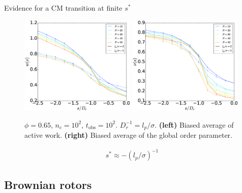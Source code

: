 \documentclass{beamer}
\begin{document}
\begin{frame}{Evidence for a CM transition at finite $s^*$}

\begin{figure}
\centering
\includegraphics[width=0.49\textwidth]{sWorkN.eps}
\hfill
\includegraphics[width=0.49\textwidth]{sOrderN.eps}
\caption{$\phi = 0.65$, $n_c = 10^2$, $t_{\text{obs}} = 10^2$. $D_r^{-1} = l_p/\sigma$. {\bf (left)} Biased average of active work. {\bf (right)} Biased average of the global order parameter.}
\end{figure}
\begin{align*}
  s^* \approx -(l_p/\sigma)^{-1}
\end{align*}

\end{frame}

\subsection{Brownian rotors}
\end{document}
